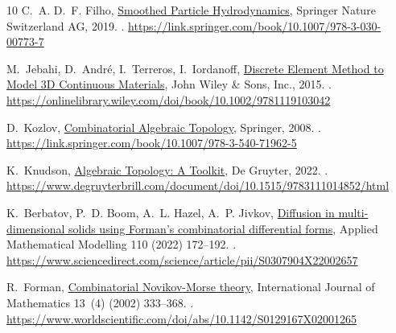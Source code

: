 \documentclass{elsarticle}
\theoremstyle{definition}
\begin{document}
\begin{thebibliography}{10}
C.~A. D.~F. Filho,
  \href{https://link.springer.com/book/10.1007/978-3-030-00773-7}{Smoothed
  Particle Hydrodynamics}, Springer Nature Switzerland AG, 2019.
\newblock \href {https://doi.org/10.1007/978-3-030-00773-7}
  {}.
\newline\urlprefix\url{https://link.springer.com/book/10.1007/978-3-030-00773-7}

M.~Jebahi, D.~André, I.~Terreros, I.~Iordanoff,
  \href{https://onlinelibrary.wiley.com/doi/book/10.1002/9781119103042}{Discrete
  Element Method to Model 3D Continuous Materials}, John Wiley \& Sons, Inc.,
  2015.
\newblock \href {https://doi.org/10.1002/9781119103042}
  {}.
\newline\urlprefix\url{https://onlinelibrary.wiley.com/doi/book/10.1002/9781119103042}

D.~Kozlov,
  \href{https://link.springer.com/book/10.1007/978-3-540-71962-5}{Combinatorial
  Algebraic Topology}, Springer, 2008.
\newblock \href {https://doi.org/10.1007/978-3-540-71962-5}
  {}.
\newline\urlprefix\url{https://link.springer.com/book/10.1007/978-3-540-71962-5}

K.~Knudson,
  \href{https://www.degruyterbrill.com/document/doi/10.1515/9783111014852/html}{Algebraic
  Topology: A Toolkit}, De Gruyter, 2022.
\newblock \href {https://doi.org/10.1515/9783111014852}
  {}.
\newline\urlprefix\url{https://www.degruyterbrill.com/document/doi/10.1515/9783111014852/html}

K.~Berbatov, P.~D. Boom, A.~L. Hazel, A.~P. Jivkov,
  \href{https://www.sciencedirect.com/science/article/pii/S0307904X22002657}{Diffusion
  in multi-dimensional solids using {Forman}'s combinatorial differential
  forms}, Applied Mathematical Modelling 110 (2022) 172--192.
\newblock \href {https://doi.org/10.1016/j.apm.2022.05.043}
  {}.
\newline\urlprefix\url{https://www.sciencedirect.com/science/article/pii/S0307904X22002657}

R.~Forman,
  \href{https://www.worldscientific.com/doi/abs/10.1142/S0129167X02001265}{Combinatorial
  {Novikov}-{Morse} theory}, International Journal of Mathematics 13~(4) (2002)
  333--368.
\newblock \href {https://doi.org/10.1142/S0129167X02001265}
  {}.
\newline\urlprefix\url{https://www.worldscientific.com/doi/abs/10.1142/S0129167X02001265}


\end{thebibliography}
\end{document}
